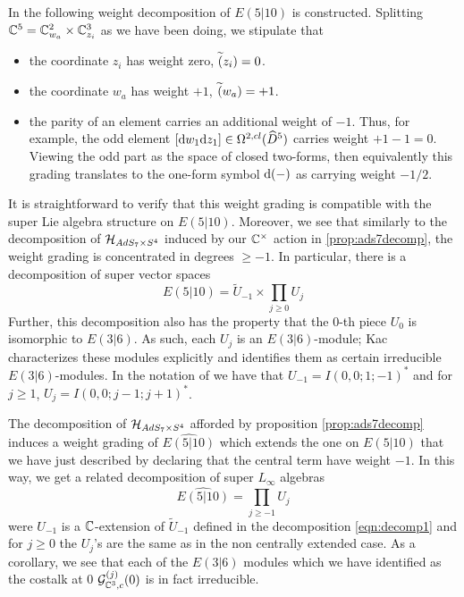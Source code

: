 In \cite{KR2} the following weight decomposition of $E(5|10)$ is constructed. Splitting $\mathbb{C}^5 = \mathbb{C}^2_{w_a}\times \mathbb{C}^3_{z_i}$ as we have been doing, we stipulate that
\begin{itemize} 
\item the coordinate $z_i$ has weight zero, $\widetilde(z_i) = 0$. 
\item the coordinate $w_a$ has weight $+1$, $\widetilde(w_a) = +1$. 
\item the parity of an element carries an additional weight of $-1$. 
Thus, for example, the odd element $[\mathrm{d} w_1 \mathrm{d} z_1] \in \Omega^{2,cl}(\widehat{D}^5)$ carries weight $+1 - 1 = 0$. Viewing the odd part as the space of closed two-forms, then equivalently this grading translates to the one-form symbol $\mathrm{d}(-)$ as carrying weight $-1/2$.
\end{itemize} 

It is straightforward to verify that this weight grading is compatible with the super Lie algebra structure on $E(5|10)$. Moreover, we see that similarly to the decomposition of $\mathcal{H}_{AdS_7\times S^4}$ induced by our $\mathbb{C}^\times$ action in \ref{prop:ads7decomp}, the weight grading is concentrated in degrees $\geq -1$.  In particular, there is a decomposition of super vector spaces
\begin{equation}\label{eqn:decomp1}
E(5|10) = \tilde U_{-1} \times \prod_{j \geq 0} U_j 
\end{equation}
Further, this decomposition also has the property that the 0-th piece $U_0$ is isomorphic to $E(3|6)$. As such, each $U_j$ is an $E(3|6)$-module; Kac characterizes these modules explicitly and identifies them as certain irreducible $E(3|6)$-modules. In the notation of \cite{KR2} we have that $U_{-1} = I(0,0;1;-1)^*$ and for $j\geq 1$, $U_j = I(0,0;j-1;j+1)^*$. 

The decomposition of $\mathcal{H}_{AdS_7\times S^4}$ afforded by proposition \ref{prop:ads7decomp} induces a weight grading of $\widehat{E(5|10)}$ which extends the one on $E(5|10)$ that we have just described by declaring that the central term have weight $-1$.
In this way, we get a related decomposition of super $L_\infty$ algebras
\begin{equation}\label{eqn:decomp2}
\widehat{E(5|10)} = \prod_{j \geq -1} U_j            
\end{equation}                      
were $U_{-1}$ is a $\mathbb{C}$-extension of $\tilde U_{-1}$ defined in the decomposition \eqref{eqn:decomp1} and for $j \geq 0$ the $U_j$'s are the same as in the non centrally extended case. As a corollary, we see that each of the $E(3|6)$ modules which we have identified as the costalk at 0 $\mathcal{G}^{(j)}_{\mathbb{C}^3, c} (0)$ is in fact irreducible.


